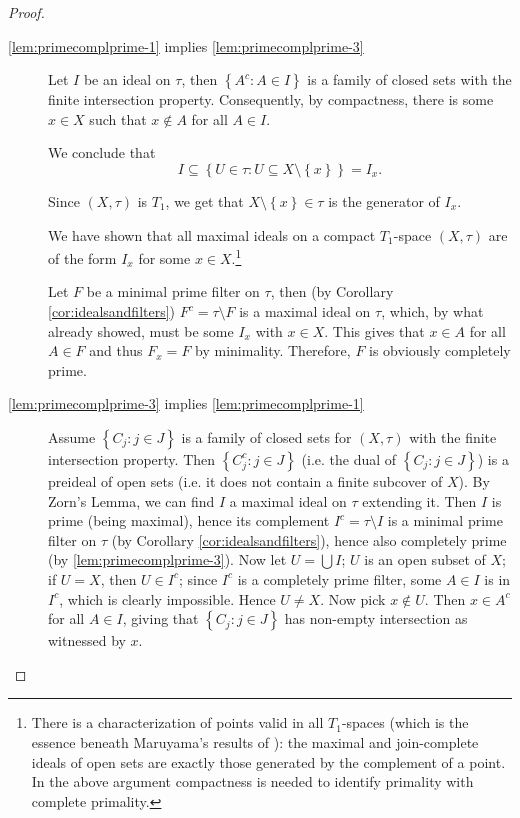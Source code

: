 \documentclass{article}
\theoremstyle{plain}
\theoremstyle{definition}
\theoremstyle{remark}
\newcommand{\bp}[1]{\left\lbrace #1 \right\rbrace}
\newcommand{\0}{\mathbbm 0}
\newcommand{\1}{\mathbbm 1}
\newcommand{\2}{\mathbbm 2}
\begin{document}
\begin{proof}
\emph{}

\begin{description}
\item[\ref{lem:primecomplprime-1} implies \ref{lem:primecomplprime-3}] 
Let $I$ be an ideal on $\tau$, then $\bp{A^c:A\in I}$ is a family of closed sets with the finite intersection property. Consequently, by compactness, there is some $x\in X$ such that
$x\not\in A$ for all $A\in I$. 


We conclude that 
\[
I\subseteq\bp{U\in\tau: U\subseteq X\setminus\bp{x}}=I_x.
\]

Since $(X,\tau)$ is $T_1$, we get that $X\setminus\bp{x}\in \tau$ is the generator of $I_x$.

We have shown that all maximal ideals on a compact $T_1$-space $(X,\tau)$ are of the form $I_x$ for some $x\in X$.\footnote{There is a characterization of points valid in all $T_1$-spaces (which is the essence beneath Maruyama's results of \cite{maruyama}): the maximal and join-complete ideals of open sets are exactly those generated by the complement of a point.
In the above argument compactness is needed to identify primality with complete primality.}

Let $F$ be a minimal prime filter on $\tau$, then (by 
Corollary \ref{cor:idealsandfilters}) $F^c=\tau\setminus F$ is a maximal ideal on $\tau$, which, by what already showed, must be some $I_x$ with $x\in X$. This gives that $x\in A$ for all $A\in F$ and thus  $F_x = F$ by minimality. Therefore, $F$ is obviously completely prime. 


\item[\ref{lem:primecomplprime-3} implies \ref{lem:primecomplprime-1}]
Assume $\bp{C_j:j\in J}$ is a family of closed sets for $(X,\tau)$ with the finite intersection property. Then $\bp{C_j^c:j\in J}$ (i.e. the dual of $\bp{C_j: j\in J}$) is a preideal of open sets (i.e. it does not contain a finite subcover of $X$).
By Zorn's Lemma, we can find $I$ a maximal ideal on $\tau$ extending it. Then $I$ is prime (being maximal), hence its complement $I^c=\tau\setminus I$ is a minimal prime filter on $\tau$ (by Corollary \ref{cor:idealsandfilters}), hence also completely prime (by \ref{lem:primecomplprime-3}). Now let $U=\bigcup I$; $U$ is an open subset of $X$; if $U=X$, then 
$U\in I^c$; since $I^c$ is a completely prime filter, some $A\in I$ is in $I^c$, which is clearly impossible. Hence
$U\neq X$. Now pick $x\notin U$. Then $x\in A^c$ for all $A\in I$, giving that 
$\bp{C_j:j\in J}$ has non-empty intersection as witnessed by $x$.

\end{description}



\end{proof}
\end{document}
